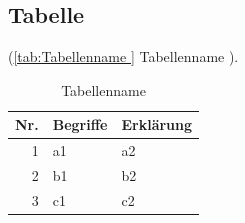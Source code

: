 \hypertarget{tabelle}{%
\subsection{Tabelle}\label{tabelle}}

(\autoref{tab:Tabellenname } Tabellenname ). %

\begin{table}[!hp] %
	\centering
	\begin{tabular} []{rll}
	\toprule %
\textbf{Nr.} & \textbf{Begriffe} & \textbf{Erklärung}\\
	\midrule
1 & a1 & a2\\
2 & b1 & b2\\
3 & c1 & c2\\
	\bottomrule
	\end{tabular}
	\caption[Tabellenname ]{Tabellenname }	%
	\label{tab:Tabellenname }	%
\end{table}
